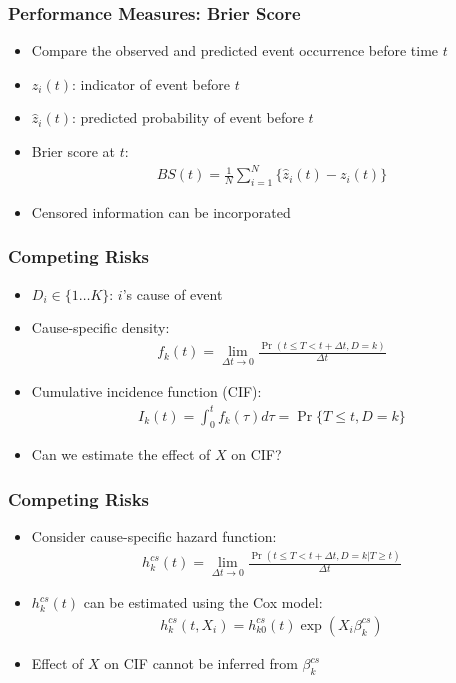 \documentclass[aspectratio=169, 12pt]{beamer}
\begin{document}
	\begin{frame}
	\frametitle{Performance Measures: Brier Score}
	\begin{itemize}
	\item Compare the observed and predicted event occurrence before time $t$
	\item $z_i(t)$: indicator of event before $t$
	\item $\hat{z}_i(t)$: predicted probability of event before $t$
	\item Brier score at $t$:
	\begin{eqnarray*}
	BS(t) = \frac{1}{N} \sum_{i=1}^N \{\hat{z}_i(t) - z_i(t) \}
	\end{eqnarray*}
	\item Censored information can be incorporated

	\end{itemize}

	\end{frame}

	\begin{frame}
	\frametitle{Competing Risks}
	\begin{itemize}
	\item $D_i \in \{1 \dots K \}$: $i$'s cause of event
	\item Cause-specific density:
	\begin{eqnarray*}
	f_k(t) = \lim_{\Delta t \to 0}\frac{\Pr(t \leq T < t + \Delta t, D = k)}{\Delta t}
	\end{eqnarray*}
	\item Cumulative incidence function (CIF):
	\begin{eqnarray*}
	I_k(t) = \int_0^t f_k(\tau)d\tau = \Pr\{T \leq t, D = k \}
	\end{eqnarray*}
	\item Can we estimate the effect of $X$ on CIF?

	\end{itemize}

	\end{frame}

	\begin{frame}
	\frametitle{Competing Risks}
	\begin{itemize}
	\item Consider cause-specific hazard function:
	\begin{eqnarray*}
	h_k^{cs} (t) = \lim_{\Delta t \to 0}\frac{\Pr(t \leq T < t + \Delta t, D = k | T \geq t)}{\Delta t}
	\end{eqnarray*}
	\item $h_k^{cs} (t)$ can be estimated using the Cox model:
	\begin{eqnarray*}
	h_k^{cs} (t, X_i) = h_{k0}^{cs} (t) \exp(X_i \beta_k^{cs})
	\end{eqnarray*}
	\item Effect of $X$ on CIF cannot be inferred from $\beta_k^{cs}$

	\end{itemize}

	\end{frame}
\end{document}
